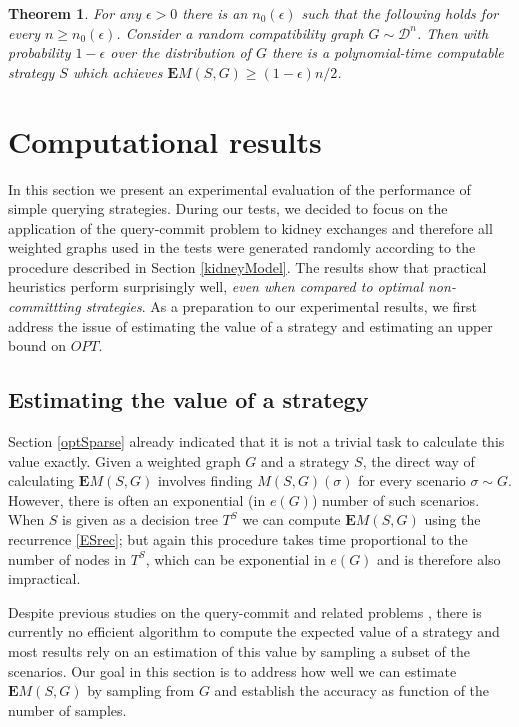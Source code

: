 \documentclass[12pt]{article}
\newtheorem{theo}{Theorem}
\newcommand{\Mf}[2]{M(#1,#2)}
\newcommand{\EMf}[2]{\mathbf{E}M(#1,#2)}
\begin{document}
		\begin{theo} \label{thmKidney}
			For any $\epsilon > 0$ there is an $n_0(\epsilon)$ such that the following holds for every $n \ge n_0(\epsilon)$. Consider a random compatibility graph $G \sim \mathcal{D}^n$. Then with probability $1 - \epsilon$ over the distribution of $G$ there is a polynomial-time computable strategy $S$ which achieves $\EMf{S}{G} \ge (1 - \epsilon) n/2$. 
		\end{theo}


	\section{Computational results} \label{experimental}
		
		In this section we present an experimental evaluation of the performance of simple querying strategies. During our tests, we decided to focus on the application of the query-commit problem to kidney exchanges and therefore all weighted graphs used in the tests were generated randomly according to the procedure described in Section \ref{kidneyModel}. The results show that practical heuristics perform surprisingly well, \emph{even when compared to optimal non-committting strategies}. As a preparation to our experimental results, we first address the issue of estimating the value of a strategy and estimating an upper bound on $OPT$.
		
		\subsection{Estimating the value of a strategy} \label{value}
		
		 Section \ref{optSparse} already indicated that it is not a trivial task to calculate this value exactly. Given a weighted graph $G$ and a strategy $S$, the direct way of calculating $\EMf{S}{G}$ involves finding $\Mf{S}{G}(\sigma)$ for every scenario $\sigma \sim G$. However, there is often an exponential (in $e(G)$) number of such scenarios. When $S$ is given as a decision tree $T^S$ we can compute $\EMf{S}{G}$ using the recurrence \eqref{ESrec}; but again this procedure takes time proportional to the number of nodes in $T^S$, which can be exponential in $e(G)$ and is therefore also impractical. 
		
		 Despite previous studies on the query-commit and related problems \cite{chen,goemansKnapsack, goemansIP}, there is currently no efficient algorithm to compute the expected value of a strategy and most results rely on an estimation of this value by sampling a subset of the scenarios. Our goal in this section is to address how well we can estimate $\EMf{S}{G}$ by sampling from $G$ and establish the accuracy as function of the number of samples. 
\end{document}
